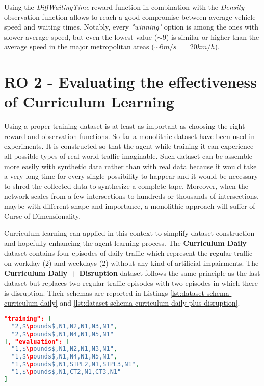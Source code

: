 Using the \textit{DiffWaitingTime} reward function in combination with the \textit{Density} observation function allows to reach a good compromise between average vehicle speed and waiting times.
Notably, every \textit{"winning"} option is among the ones with slower average speed, but even the lowest value ($\sim9$) is similar or higher than the average speed in the major metropolitan areas ($\sim 6 m/s \; = \; 20 km/h$).

\section{RO 2 - Evaluating the effectiveness of Curriculum Learning}

Using a proper training dataset is at least as important as choosing the right reward and observation functions.
So far a monolithic dataset have been used in experiments.
It is constructed so that the agent while training it can experience all possible types of real-world traffic imaginable.
Such dataset can be assemble more easily with synthetic data rather than with real data because it would take a very long time for every single possibility to happear and it would be necessary to shred the collected data to synthesize a complete tape.
Moreover, when the network scales from a few intersections to hundreds or thousands of intersections, maybe with different shape and importance, a monolithic approach will suffer of Curse of Dimensionality.

Curriculum learning can applied in this context to simplify dataset construction and hopefully enhancing the agent learning process.
The \textbf{Curriculum Daily} dataset contains four episodes of daily traffic which represent the regular traffic on workday (2) and weekdays (2) without any kind of artificial impairments.
The \textbf{Curriculum Daily + Disruption} dataset follows the same principle as the last dataset but replaces two regular traffic episodes with two episodes in which there is disruption.
Their schemas are reported in Listings \ref{lst:dataset-schema-curriculum-daily} and \ref{lst:dataset-schema-curriculum-daily-plus-disruption}.

\noindent
\begin{minipage}{\linewidth}
\begin{lstlisting}[language=JSON, caption=The schema for the "Curriculum Daily" Dataset, label={lst:dataset-schema-curriculum-daily}, mathescape=true]
"training": [
  "2,$\pounds$,N1,N2,N1,N3,N1",
  "2,$\pounds$,N1,N4,N1,N5,N1"
], "evaluation": [
  "1,$\pounds$,N1,N2,N1,N3,N1",
  "1,$\pounds$,N1,N4,N1,N5,N1",
  "1,$\pounds$,N1,STPL2,N1,STPL3,N1",
  "1,$\pounds$,N1,CT2,N1,CT3,N1"
]
\end{lstlisting}
\end{minipage}


